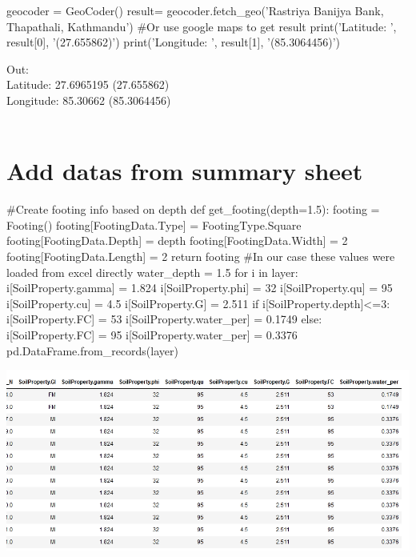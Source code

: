 \begin{python}
geocoder = GeoCoder()
result= geocoder.fetch_geo('Rastriya Banijya Bank, Thapathali, Kathmandu')
#Or use google maps to get result
print('Latitude: ', result[0], '(27.655862)')
print('Longitude: ', result[1], '(85.3064456)')
\end{python}
Out:\\
Latitude:  27.6965195 (27.655862)\\
Longitude:  85.30662 (85.3064456)\\
\\

\section{Add datas from summary sheet}
\begin{python}
#Create footing info based on depth
def get_footing(depth=1.5):
    footing = Footing()
    footing[FootingData.Type] = FootingType.Square
    footing[FootingData.Depth] = depth
    footing[FootingData.Width] = 2
    footing[FootingData.Length] = 2
    return footing
#In our case these values were loaded from excel directly
water_depth = 1.5
for i in layer:
    i[SoilProperty.gamma] = 1.824
    i[SoilProperty.phi] = 32
    i[SoilProperty.qu] = 95
    i[SoilProperty.cu] = 4.5
    i[SoilProperty.G] = 2.511
    if i[SoilProperty.depth]<=3:
        i[SoilProperty.FC] = 53
        i[SoilProperty.water_per] = 0.1749
    else:
        i[SoilProperty.FC] = 95
        i[SoilProperty.water_per] = 0.3376
pd.DataFrame.from_records(layer)
\end{python}
\includegraphics[width=\linewidth,keepaspectratio]{./images/sample/ass.png}\\\\

